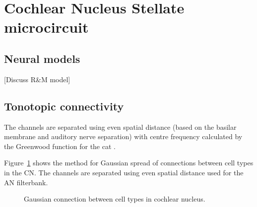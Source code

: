 \section{Cochlear Nucleus Stellate microcircuit}

\subsection{Neural models}

[Discuss R\&M model]

\medskip{}

\subsection{Tonotopic connectivity}

The channels are separated using even spatial distance (based on the
basilar membrane and auditory nerve separation) with centre frequency
calculated by the Greenwood function for the cat
\citep{Greenwood:1990}. 

\medskip{}

Figure~\ref{fig:CNconn} shows the method for Gaussian spread of
connections between cell types in the CN\@.  The channels are separated
using even spatial distance used for the AN filterbank.


\begin{figure}[tbh]
  \begin{center}
    \caption{Gaussian connection between cell types in cochlear
      nucleus. }
    \label{fig:CNconn}
  \end{center}
\end{figure}







